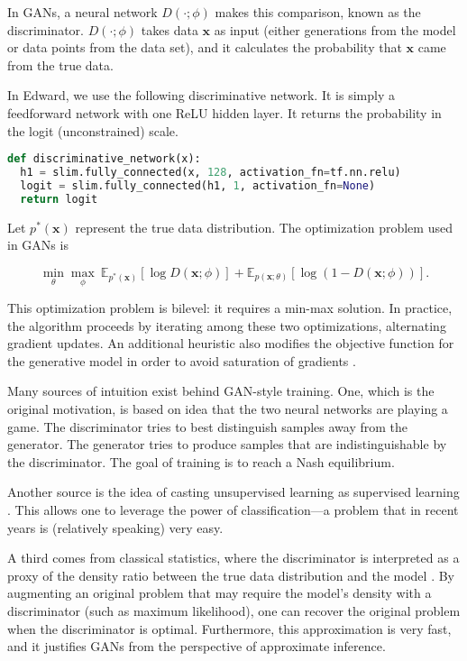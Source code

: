 In GANs, a neural network $D(\cdot;\phi)$ makes this comparison,
known as the discriminator.
$D(\cdot;\phi)$ takes data $\mathbf{x}$ as input (either
generations from the model or data points from the data set), and it
calculates the probability that $\mathbf{x}$ came from the true data.

In Edward, we use the following discriminative network. It is simply a
feedforward network with one ReLU hidden layer. It returns the
probability in the logit (unconstrained) scale.

\begin{lstlisting}[language=Python]
def discriminative_network(x):
  h1 = slim.fully_connected(x, 128, activation_fn=tf.nn.relu)
  logit = slim.fully_connected(h1, 1, activation_fn=None)
  return logit
\end{lstlisting}

Let $p^*(\mathbf{x})$ represent the true data distribution.
The optimization problem used in GANs is

\begin{equation*}
\min_\theta \max_\phi~
\mathbb{E}_{p^*(\mathbf{x})} [ \log D(\mathbf{x}; \phi) ]
+ \mathbb{E}_{p(\mathbf{x}; \theta)} [ \log (1 - D(\mathbf{x}; \phi)) ].
\end{equation*}

This optimization problem is bilevel: it requires a min-max solution.
In practice, the algorithm proceeds by iterating among these two
optimizations, alternating gradient updates. An
additional heuristic also modifies the objective function for the
generative model in order to avoid saturation of gradients
\citep{goodfellow2014on}.

Many sources of intuition exist behind GAN-style training. One, which
is the original motivation, is based on idea that the two neural
networks are playing a game. The discriminator tries to best
distinguish samples away from the generator. The generator tries
to produce samples that are indistinguishable by the discriminator.
The goal of training is to reach a Nash equilibrium.

Another source is the idea of casting unsupervised learning as
supervised learning
\citep{gutmann2010noise,gutmann2014statistical}.
This allows one to leverage the power of classification—a problem that
in recent years is (relatively speaking) very easy.

A third comes from classical statistics, where the discriminator is
interpreted as a proxy of the density ratio between the true data
distribution and the model
\citep{sugiyama2012density,mohamed2016learning}. By augmenting an
original problem that may require the model's density with a
discriminator (such as maximum likelihood), one can recover the
original problem when the discriminator is optimal. Furthermore, this
approximation is very fast, and it justifies GANs from the perspective
of approximate inference.

